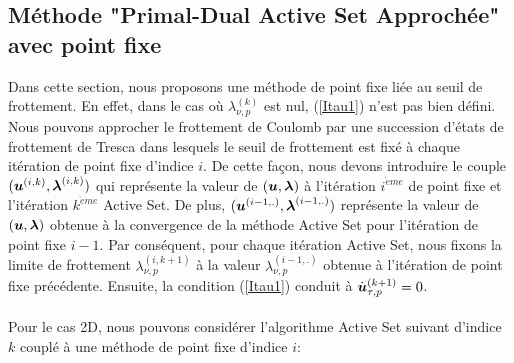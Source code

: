 \subsection{Méthode "Primal-Dual Active Set Approchée" avec point fixe}

Dans cette section, nous proposons une méthode de point fixe liée au seuil de frottement. En effet, dans le cas où $\lambda_{\nu, p}^{(k)}$ est nul, (\ref{Itau1}) n'est pas bien défini. Nous pouvons approcher le frottement de Coulomb par une succession d'états de frottement de Tresca dans lesquels le seuil de frottement est fixé à chaque itération de point fixe d'indice $i$. De cette façon, nous devons introduire le couple $(\mbox{\boldmath{$u$}}^{(i,k)},\mbox{\boldmath{$\lambda$}}^{(i,k)})$ qui représente la valeur de $(\mbox{\boldmath{$u$}},\mbox{\boldmath{$\lambda$}})$ à l'itération $i^{\grave{e}me}$ de point fixe et l'itération $ k^{\grave{e}me}$ Active Set. De plus, $(\mbox{\boldmath{$u$}}^{(i-1,.)},\mbox{\boldmath{$\lambda$}}^{(i-1,.)})$ représente la valeur de $(\mbox{\boldmath{$u$}},\mbox{\boldmath{$\lambda$}})$ obtenue à la convergence de la méthode Active Set pour l'itération de point fixe $i-1$. Par conséquent, pour chaque itération Active Set, nous fixons la limite de frottement $\lambda_{\nu, p}^{(i,k+1)}$ à la valeur $\lambda_{\nu, p}^{(i-1,.)}$ obtenue à l'itération de point fixe précédente. Ensuite, la condition (\ref{Itau1}) conduit à $\dot{\mbox{\boldmath{$u$}}}_{\tau, p}^{(k+1)}=0$.\\

\noindent {}\\

Pour le cas 2D, nous pouvons considérer l'algorithme Active Set suivant d'indice $k$ couplé à une méthode de point fixe d'indice $i$:

